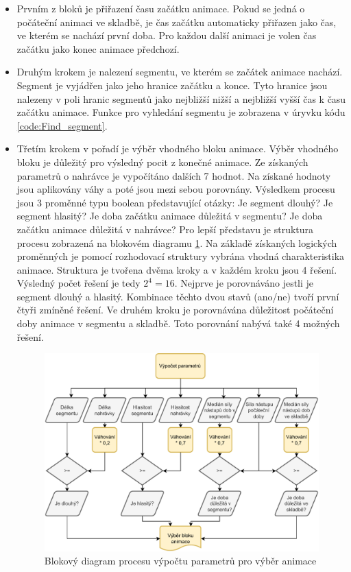 \begin{itemize}
    \item  
    Prvním z bloků je přiřazení času začátku animace. Pokud se jedná o počáteční animaci ve skladbě, je čas začátku automaticky přiřazen jako čas, ve kterém se nachází první doba. Pro každou další animaci je volen čas začátku jako konec animace předchozí.
    \item 
    Druhým krokem je nalezení segmentu, ve kterém se začátek animace nachází. Segment je vyjádřen jako jeho hranice začátku a konce. Tyto hranice jsou nalezeny v poli hranic segmentů jako nejbližší nižší a nejbližší vyšší čas k času začátku animace. Funkce pro vyhledání segmentu je zobrazena v úryvku kódu \ref{code:Find_segment}. 

    \item 
    Třetím krokem v pořadí je výběr vhodného bloku animace. Výběr vhodného bloku je důležitý pro výsledný pocit z konečné animace. Ze získaných parametrů o nahrávce je vypočítáno dalších 7 hodnot. Na získané hodnoty jsou aplikovány váhy a poté jsou mezi sebou porovnány. Výsledkem procesu jsou 3 proměnné typu boolean představující otázky: Je segment dlouhý? Je segment hlasitý? Je doba začátku animace důležitá v segmentu? Je doba začátku animace důležitá v nahrávce? Pro lepší představu je struktura procesu zobrazená na blokovém diagramu \ref{fig:Anim_block_param_selection_diagram}. Na základě získaných logických proměnných je pomocí rozhodovací struktury vybrána vhodná charakteristika animace. Struktura je tvořena dvěma kroky a v každém kroku jsou 4 řešení. Výsledný počet řešení je tedy $2^4 = 16$. Nejprve je porovnáváno jestli je segment dlouhý a hlasitý. Kombinace těchto dvou stavů (ano/ne) tvoří první čtyři zmíněné řešení. Ve druhém kroku je porovnávána důležitost počáteční doby animace v segmentu a skladbě. Toto porovnání nabývá také 4 možných řešení.  

    \begin{figure}[H]
        \centering
        \includegraphics[width = 1\linewidth]{obrazky/UML_diagramy_anim_bock_selection _part_1.pdf}
        \caption{Blokový diagram procesu výpočtu parametrů pro výběr animace}
        \label{fig:Anim_block_param_selection_diagram}
    \end{figure}


\end{itemize}
